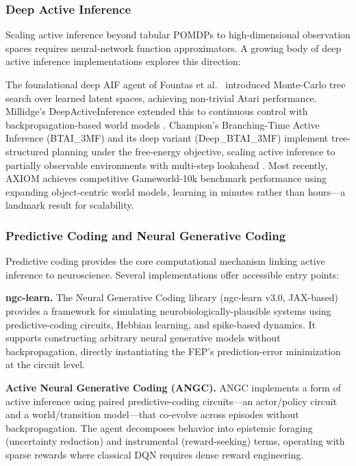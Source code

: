 \documentclass[
  english,
]{article}
\begin{document}
{{{{{{{{{{{{{{{{\subsubsection{Deep Active Inference}\label{deep-active-inference}

Scaling active inference beyond tabular POMDPs to high-dimensional
observation spaces requires neural-network function approximators. A
growing body of deep active inference implementations explores this
direction:

The foundational deep AIF agent of Fountas et
al.~\citep{fountas2020deep} introduced Monte-Carlo tree search over
learned latent spaces, achieving non-trivial Atari performance.
Millidge's DeepActiveInference extended this to continuous control with
backpropagation-based world models \citep{millidge2020deep}. Champion's
Branching-Time Active Inference (BTAI\_3MF) and its deep variant
(Deep\_BTAI\_3MF) implement tree-structured planning under the
free-energy objective, scaling active inference to partially observable
environments with multi-step lookahead \citep{champion2021realizing}.
Most recently, AXIOM \citep{heins2025axiom} achieves competitive
Gameworld-10k benchmark performance using expanding object-centric world
models, learning in minutes rather than hours---a landmark result for
scalability.

\subsubsection{Predictive Coding and Neural Generative
Coding}\label{predictive-coding-and-neural-generative-coding}

Predictive coding provides the core computational mechanism linking
active inference to neuroscience. Several implementations offer
accessible entry points:

\textbf{ngc-learn.} The Neural Generative Coding library (ngc-learn
v3.0, JAX-based) provides a framework for simulating
neurobiologically-plausible systems using predictive-coding circuits,
Hebbian learning, and spike-based dynamics. It supports constructing
arbitrary neural generative models without backpropagation, directly
instantiating the FEP's prediction-error minimization at the circuit
level.

\textbf{Active Neural Generative Coding (ANGC).} ANGC implements a form
of active inference using paired predictive-coding circuits---an
actor/policy circuit and a world/transition model---that co-evolve
across episodes without backpropagation. The agent decomposes behavior
into epistemic foraging (uncertainty reduction) and instrumental
(reward-seeking) terms, operating with sparse rewards where classical
DQN requires dense reward engineering.

}}}}}}}}}}}}}}}}
\end{document}
